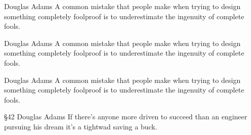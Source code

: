 \documentclass[12pt]{article}
\begin{document}
\begin{shadequote}[l]{Douglas Adams}
A common mistake that people make when trying to design something completely foolproof is to underestimate the ingenuity of complete fools.
\end{shadequote}

\begin{shadequote}[r]{Douglas Adams}
A common mistake that people make when trying to design something completely foolproof is to underestimate the ingenuity of complete fools.
\end{shadequote}

\begin{shadequote}[c]{Douglas Adams}
A common mistake that people make when trying to design something completely foolproof is to underestimate the ingenuity of complete fools.
\end{shadequote}

\begin{shadelaw}{§42 Douglas Adams}
If there's anyone more driven to succeed than an engineer pursuing his dream it's a tightwad saving a buck.
\end{shadelaw}

\lipsum
\end{document}
